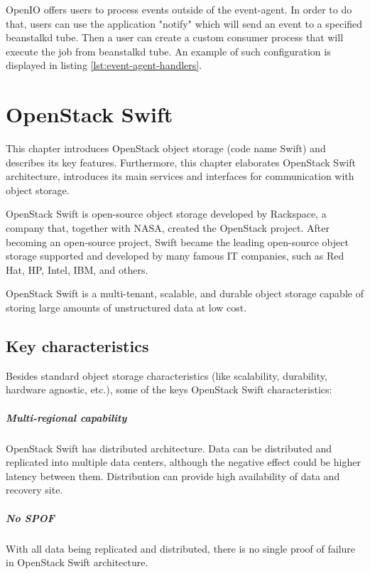     OpenIO offers users to process events outside of the event-agent. In order to do that, users can use the application "notify" which will send an event to a specified beanstalkd tube. Then a user can create a custom consumer process that will execute the job from beanstalkd tube. An example of such configuration is displayed in listing \ref{lst:event-agent-handlers}.

\chapter{OpenStack Swift}
    This chapter introduces OpenStack object storage (code name Swift) and describes its key features. Furthermore, this chapter elaborates OpenStack Swift architecture, introduces its main services and interfaces for communication with object storage.

    OpenStack Swift is open-source object storage developed by Rackspace, a company that, together with NASA, created the OpenStack project. After becoming an open-source project, Swift became the leading open-source object storage supported and developed by many famous IT companies, such as Red Hat, HP, Intel, IBM, and others.

    OpenStack Swift is a multi-tenant, scalable, and durable object storage capable of storing large amounts of unstructured data at low cost\cite{swiftOpenStackSwift}.

    \section{Key characteristics}
    Besides standard object storage characteristics (like scalability, durability, hardware agnostic, etc.), some of the keys OpenStack Swift characteristics:

    \paragraph{Multi-regional capability}
    OpenStack Swift has distributed architecture. Data can be distributed and replicated into multiple data centers, although the negative effect could be higher latency between them. Distribution can provide high availability of data and recovery site\cite{swiftOpenStackSwift}.

    \paragraph{No SPOF}
    With all data being replicated and distributed, there is no single proof of failure in OpenStack Swift architecture.

